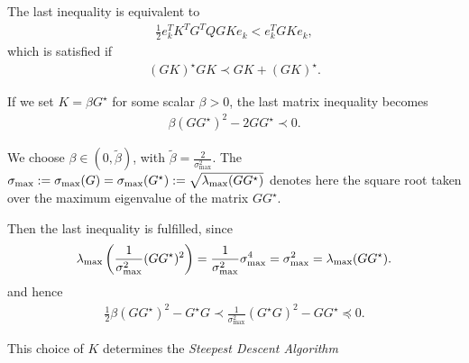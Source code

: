 The last inequality is equivalent to 
\begin{align}
\frac{1}{2}e_k^T K^T G^T Q GK e_k < e_k^T GK e_k, 
\end{align}
which is satisfied if 
\begin{align}
(G K )^\star G K  \prec G K + (GK)^\star.
\end{align}

If we set $K = \beta G^\star$ for some scalar $\beta > 0$, the last matrix inequality becomes 
\begin{align}
\beta (G G^\star)^2 - 2 G G^\star \prec 0.
\end{align}

We choose  $\beta \in (0, \tilde{\beta})$, with  $\tilde{\beta} = \frac{2}{\sigma_{\max}^2}$. The $\sigma_{\max}:= \sigma_{\max}(G) = \sigma_{\max}(G^\star) := \sqrt{\lambda_{\mathrm{max}}(G G^\star)}$ denotes here the square root taken over the maximum eigenvalue of the matrix $G G^\star$.%

Then the last inequality is fulfilled, since 
\begin{align}
\begin{split}
\lambda_{\max}\left( \frac{1}{\sigma_{\max} ^2}(G G^\star)^2 \right)  = \frac{1}{\sigma_{\max}^2} \sigma_{\max}^4 = \sigma_{\max}^2 = \lambda_{\mathrm{max}}(GG^\star).
\end{split}
\end{align} 
and hence
\begin{align}
\frac{1}{2}\beta (G G^\star)^2 - G^\star G  \prec \frac{1}{\sigma_{\max}^2} (G^\star G)^2 - G G^\star \preceq 0.
\end{align}


This choice of $K$ determines the \textit{Steepest Descent Algorithm}

